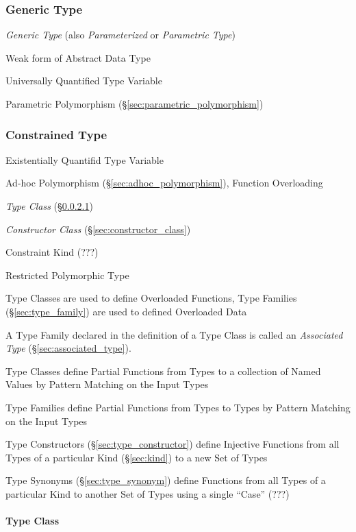 \subsubsection{Generic Type}\label{sec:generic_type}

\emph{Generic Type} (also \emph{Parameterized} or \emph{Parametric
  Type})

Weak form of Abstract Data Type

Universally Quantified Type Variable

Parametric Polymorphism (\S\ref{sec:parametric_polymorphism})



\subsubsection{Constrained Type}\label{sec:constrained_type}

Existentially Quantifid Type Variable

Ad-hoc Polymorphism (\S\ref{sec:adhoc_polymorphism}), Function
Overloading

\emph{Type Class} (\S\ref{sec:type_class})

\emph{Constructor Class} (\S\ref{sec:constructor_class})

Constraint Kind (???) %

Restricted Polymorphic Type %

Type Classes are used to define Overloaded Functions, Type Families
(\S\ref{sec:type_family}) are used to defined Overloaded Data

A Type Family declared in the definition of a Type Class is called an
\emph{Associated Type} (\S\ref{sec:associated_type}).

Type Classes define Partial Functions from Types to a collection of
Named Values by Pattern Matching on the Input Types

\fist Type Families define Partial Functions from Types to Types by
Pattern Matching on the Input Types

\fist Type Constructors (\S\ref{sec:type_constructor}) define
Injective Functions from all Types of a particular Kind
(\S\ref{sec:kind}) to a new Set of Types

\fist Type Synonyms (\S\ref{sec:type_synonym}) define Functions from
all Types of a particular Kind to another Set of Types using a single
``Case'' (???) %



\paragraph{Type Class}\label{sec:type_class}\hfill

